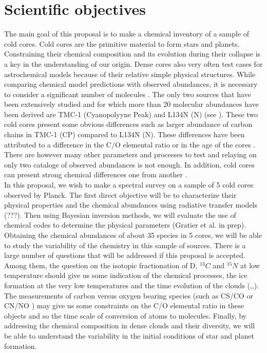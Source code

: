 \section{Scientific objectives}

The main goal of this proposal is to make a chemical inventory of a sample of cold cores. Cold cores are the primitive material to form stars and planets. Constraining their chemical composition and its evolution during their collapse is a key in the understanding of our origin. Dense cores also very often test cases for astrochemical models because of their relative simple physical structures. While comparing chemical model predictions with observed abundances, it is necessary to consider a significant number of molecules \cite{Wakelam_2006,2013ChRv..113.8710A}. The only two sources that have been extensively studied and for which more than 20 molecular abundances have been derived are TMC-1 (Cyanopolyyne Peak) and L134N (N) (see \cite{2013ChRv..113.8710A}). These two cold cores present some obvious differences such as larger abundance of carbon chains in TMC-1 (CP) compared to L134N (N). These differences have been attributed to a difference in the C/O elemental ratio \cite{1998ApJ...501..207T} or in the age of the cores \cite{2013ChRv..113.8710A}. There are however many other parameters and processes to test and relaying on only two catalogs of observed abundances is not enough. In addition, cold cores can present strong chemical differences one from another \cite{2006FaDi..133...63B}.\\
In this proposal, we wish to make a spectral survey on a sample of 5 cold cores observed by Planck. The first direct objective will be to characterize their physical properties and the chemical abundances using radiative transfer models (???). Then using Bayesian inversion methods, we will evaluate the use of chemical codes to determine the physical parameters (Gratier et al. in prep). Obtaining the chemical abundances of about 35 species in 5 cores, we will be able to study the variability of the chemistry in this sample of sources. There is a large number of questions that will be addressed if this proposal is accepted. Among them, the question on the isotopic fractionation of D, $^{13}C$ and $^{15}N$ at low temperature should give us some indication of the chemical processes, the ice formation at the very low temperatures and the time evolution of the clouds (\cite{2013A&A...551A..38P},\cite{2014prpl.conf..859C},\cite{2015A&A...576A..99R}). The measurements of carbon versus oxygen bearing species (such as CS/CO \cite{1997ApJ...482..285B} or CN/NO \cite{2014A&A...562A..83L}) may give us some constraints on the C/O elemental ratio in these objects and so the time scale of conversion of atoms to molecules. Finally, by addressing the chemical composition in dense clouds and their diversity, we will be able to understand the variability in the initial conditions of star and planet formation. 

  